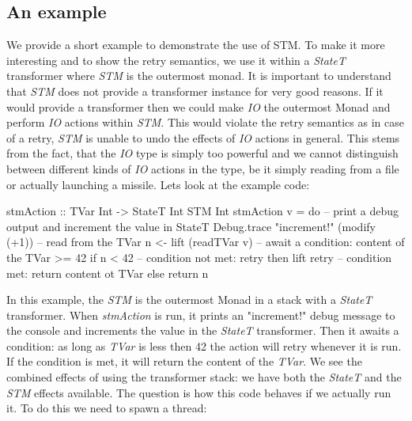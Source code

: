 \subsection{An example}
We provide a short example to demonstrate the use of STM. To make it more interesting and to show the retry semantics, we use it within a \textit{StateT} transformer where \textit{STM} is the outermost monad. It is important to understand that \textit{STM} does not provide a transformer instance for very good reasons. If it would provide a transformer then we could make \textit{IO} the outermost Monad and perform \textit{IO} actions within \textit{STM}. This would violate the retry semantics as in case of a retry, \textit{STM} is unable to undo the effects of \textit{IO} actions in general. This stems from the fact, that the \textit{IO} type is simply too powerful and we cannot distinguish between different kinds of \textit{IO} actions in the type, be it simply reading from a file or actually launching a missile. %
Lets look at the example code:

\begin{HaskellCode}
stmAction :: TVar Int -> StateT Int STM Int 
stmAction v = do
  -- print a debug output and increment the value in StateT 
  Debug.trace "increment!" (modify (+1))
  -- read from the TVar
  n <- lift (readTVar v)
  -- await a condition: content of the TVar >= 42
  if n < 42
    -- condition not met: retry
    then lift retry
    -- condition met: return content ot TVar
    else return n
\end{HaskellCode}

In this example, the \textit{STM} is the outermost Monad in a stack with a \textit{StateT} transformer. When \textit{stmAction} is run, it prints an "increment!" debug message to the console and increments the value in the \textit{StateT} transformer. Then it awaits a condition: as long as \textit{TVar} is less then 42 the action will retry whenever it is run. If the condition is met, it will return the content of the \textit{TVar}. We see the combined effects of using the transformer stack: we have both the \textit{StateT} and the \textit{STM} effects available. The question is how this code behaves if we actually run it. To do this we need to spawn a thread:

